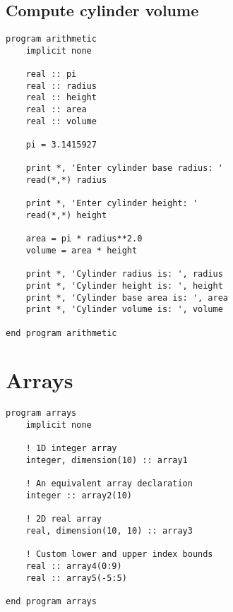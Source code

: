 \documentclass[]{article}
\begin{document}
\subsection{Compute cylinder volume}
\begin{lstlisting}
program arithmetic
    implicit none

    real :: pi
    real :: radius
    real :: height
    real :: area
    real :: volume

    pi = 3.1415927

    print *, 'Enter cylinder base radius: '
    read(*,*) radius

    print *, 'Enter cylinder height: '
    read(*,*) height

    area = pi * radius**2.0
    volume = area * height

    print *, 'Cylinder radius is: ', radius
    print *, 'Cylinder height is: ', height
    print *, 'Cylinder base area is: ', area
    print *, 'Cylinder volume is: ', volume

end program arithmetic
\end{lstlisting}

\section{Arrays}

\begin{lstlisting}
program arrays
    implicit none

    ! 1D integer array
    integer, dimension(10) :: array1

    ! An equivalent array declaration
    integer :: array2(10)

    ! 2D real array
    real, dimension(10, 10) :: array3

    ! Custom lower and upper index bounds
    real :: array4(0:9)
    real :: array5(-5:5)

end program arrays
\end{lstlisting}
\end{document}
